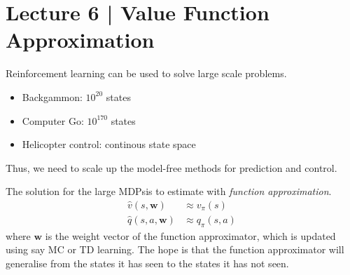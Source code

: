 \section{Lecture 6 | Value Function Approximation}
Reinforcement learning can be used to solve large scale problems.
\begin{itemize}
    
    \item Backgammon: \(10^{20}\) states
    \item Computer Go: \(10^{170}\) states
    \item Helicopter control: continous state space 
\end{itemize}
Thus, we need to scale up the model-free methods for prediction and control.

The solution for the large MDPsis to estimate with \emph{function approximation}.
\[
    \begin{aligned}
        \hat{v}(s,\mathbf{w}) &\approx v_{\pi}(s) \\
        \hat{q}(s,a,\mathbf{w}) &\approx q_{\pi}(s,a)
    \end{aligned}  
\]
where \(\mathbf{w}\) is the weight vector of the function approximator, which is updated 
using say MC or TD learning. The hope is that the function approximator will generalise
from the states it has seen to the states it has not seen.

